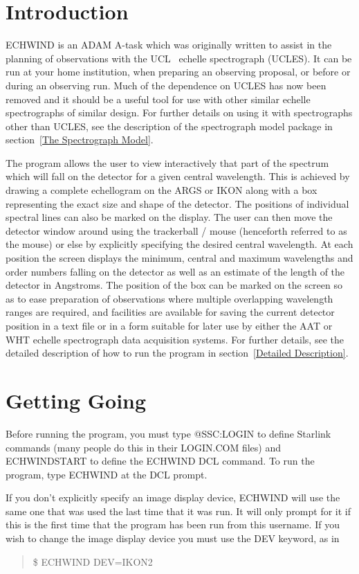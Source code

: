 \section{Introduction}

ECHWIND is an ADAM A-task which was originally written to assist in the
planning of observations with the UCL \coude\ echelle spectrograph (UCLES). It
can be run at your home institution, when preparing an observing proposal, or
before or during an observing run. Much of the dependence on UCLES has now been
removed and it should be a useful tool for use with other similar echelle
spectrographs of similar design. For further details on using it with
spectrographs other than UCLES, see the description of the spectrograph model
package in section~\ref{The Spectrograph Model}.   

The program allows the user to view interactively that part of the spectrum
which will fall on the detector for a given central wavelength. This is
achieved by drawing a complete echellogram on the ARGS or IKON along with a box
representing the exact size and shape of the detector. The positions of
individual spectral lines can also be marked on the display. The user can then
move the detector window around using the trackerball / mouse (henceforth
referred to as the mouse) or else by explicitly specifying the desired central
wavelength. At each position the screen displays the minimum, central and
maximum wavelengths and order numbers falling on the detector as well as an
estimate of the length of the detector in Angstroms.  The position of the box
can be marked on the screen so as to ease preparation of observations where
multiple overlapping wavelength ranges are required, and facilities are
available for saving the current detector position in a text file or in a form
suitable for later use by either the AAT or WHT echelle spectrograph data
acquisition systems. For further details, see the detailed description of how
to run the program in section~\ref{Detailed Description}.

\section{Getting Going}

Before running the program, you must type @SSC:LOGIN to define Starlink
commands (many people do this in their LOGIN.COM files) and ECHWINDSTART to
define the ECHWIND DCL command. To run the program, type ECHWIND at the DCL
prompt.

If you don't explicitly specify an image display device, ECHWIND will use
the same one that was used the last time that it was run. It will only prompt
for it if this is the first time that the program has been run from this
username. If you wish to change the image display device you must use the DEV
keyword, as in
\begin{quote}
\$ ECHWIND DEV=IKON2
\end{quote}


